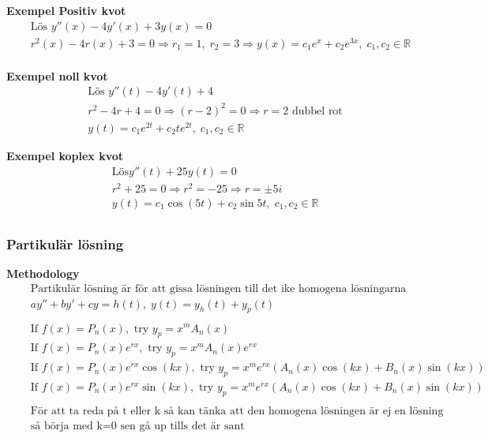 \textbf{Exempel Positiv kvot}
\begin{align*}
  &\quad  \text{Lös } y''(x)-4y'(x)+3y(x)=0 \\
  &\quad  r^2(x)-4r(x)+3=0 \Rightarrow r_1=1, \; r_2=3 \Rightarrow y(x) = c_1e^x + c_2e^{3x}, \;
  c_1,c_2 \in\mathbb{R} \\
\end{align*}

\textbf{Exempel noll kvot}
\begin{align*}
  &\quad  \text{Lös } y''(t)-4y'(t)+4 \\
  &\quad  r^2-4r+4=0 \Rightarrow {(r-2)}^2=0 \Rightarrow r=2 \text{ dubbel rot} \\
  &\quad  y(t) = c_1e^{2t} + c_2te^{2t}, \; c_1,c_2 \in\mathbb{R}
\end{align*}

\textbf{Exempel koplex kvot}
\begin{align*}
  &\quad  \text{Lös} y''(t) + 25y(t) = 0 \\
  &\quad  r^2 + 25 = 0 \Rightarrow r^2 = -25 \Rightarrow r=\pm5i \\
  &\quad  y(t) = c_1\cos(5t)+c_2\sin{5t}, \; c_1,c_2 \in\mathbb{R} \\
\end{align*}



\subsubsection{Partikulär lösning}
\textbf{Methodology}  %
\begin{align*}
  &\quad  \text{Partikulär lösning är för att gissa lösningen till det ike homogena lösningarna} \\
  &\quad  ay''+by'+cy=h(t), \; y(t) = y_h(t) + y_p(t) \\
  &\quad  \\
  &\quad  \text{If } f(x)=P_n(x), \text{ try } y_p=x^m A_n(x) \\
  &\quad  \text{If } f(x)=P_n(x)e^{rx}, \text{ try } y_p=x^m A_n(x)e^{rx} \\
  &\quad  \text{If } f(x)=P_n(x)e^{rx}\cos(kx), \text{ try } y_p=x^m e^{rx}(A_n(x)\cos(kx)+B_n(x)\sin(kx)) \\
  &\quad  \text{If } f(x)=P_n(x)e^{rx}\sin(kx), \text{ try } y_p=x^m e^{rx}(A_n(x)\cos(kx)+B_n(x)\sin(kx)) \\ 
  &\quad  \\
  &\quad  \text{För att ta reda på t eller k så kan tänka att den homogena lösningen är ej en lösning } \\
  &\quad  \text{så börja med k=0 sen gå up tills det är sant} \\
\end{align*}


